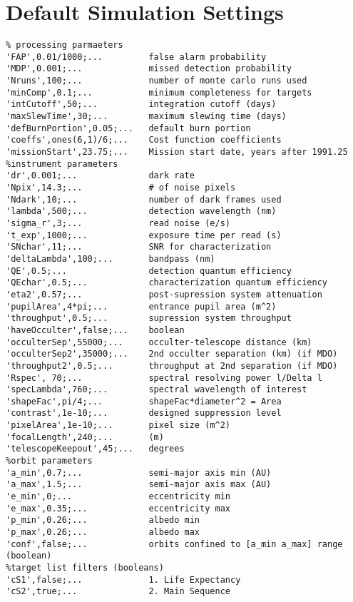 \chapter{Default Simulation Settings}\label{app:defSets}

\begin{verbatim}
% processing parmaeters
'FAP',0.01/1000;...         false alarm probability
'MDP',0.001;...             missed detection probability
'Nruns',100;...             number of monte carlo runs used
'minComp',0.1;...           minimum completeness for targets
'intCutoff',50;...          integration cutoff (days)
'maxSlewTime',30;...        maximum slewing time (days)
'defBurnPortion',0.05;...   default burn portion
'coeffs',ones(6,1)/6;...    Cost function coefficients
'missionStart',23.75;...    Mission start date, years after 1991.25
%instrument parameters
'dr',0.001;...              dark rate
'Npix',14.3;...             # of noise pixels
'Ndark',10;...              number of dark frames used
'lambda',500;...            detection wavelength (nm)
'sigma_r',3;...             read noise (e/s)
't_exp',1000;...            exposure time per read (s)
'SNchar',11;...             SNR for characterization
'deltaLambda',100;...       bandpass (nm)
'QE',0.5;...                detection quantum efficiency
'QEchar',0.5;...            characterization quantum efficiency
'eta2',0.57;...             post-supression system attenuation
'pupilArea',4*pi;...        entrance pupil area (m^2)
'throughput',0.5;...        supression system throughput
'haveOcculter',false;...    boolean
'occulterSep',55000;...     occulter-telescope distance (km)
'occulterSep2',35000;...    2nd occulter separation (km) (if MDO)
'throughput2',0.5;...       throughput at 2nd separation (if MDO)
'Rspec', 70;...             spectral resolving power l/Delta l
'specLambda',760;...        spectral wavelength of interest
'shapeFac',pi/4;...         shapeFac*diameter^2 = Area
'contrast',1e-10;...        designed suppression level
'pixelArea',1e-10;...       pixel size (m^2)
'focalLength',240;...       (m)
'telescopeKeepout',45;...   degrees
%orbit parameters
'a_min',0.7;...             semi-major axis min (AU)
'a_max',1.5;...             semi-major axis max (AU)
'e_min',0;...               eccentricity min
'e_max',0.35;...            eccentricity max
'p_min',0.26;...            albedo min
'p_max',0.26;...            albedo max
'conf',false;...            orbits confined to [a_min a_max] range (boolean)
%target list filters (booleans)
'cS1',false;...             1. Life Expectancy
'cS2',true;...              2. Main Sequence

\end{verbatim}
